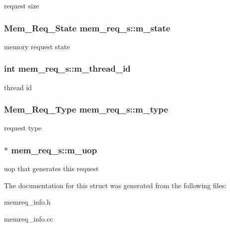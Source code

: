 \label{structmem__req__s_a4d0488370174c8f3b7200cc4658c9d32}
request size \hypertarget{structmem__req__s_a06db9581649b020ba9b693397a2b90f7}{
\subsubsection[{m\_\-state}]{\setlength{\rightskip}{0pt plus 5cm}Mem\_\-Req\_\-State {\bf mem\_\-req\_\-s::m\_\-state}}}
\label{structmem__req__s_a06db9581649b020ba9b693397a2b90f7}
memory request state \hypertarget{structmem__req__s_a8f90cf134af2d0965d436574f77693ef}{
\subsubsection[{m\_\-thread\_\-id}]{\setlength{\rightskip}{0pt plus 5cm}int {\bf mem\_\-req\_\-s::m\_\-thread\_\-id}}}
\label{structmem__req__s_a8f90cf134af2d0965d436574f77693ef}
thread id \hypertarget{structmem__req__s_a9cc3c968ca7bea8f7e9585b2aaea0ede}{
\subsubsection[{m\_\-type}]{\setlength{\rightskip}{0pt plus 5cm}Mem\_\-Req\_\-Type {\bf mem\_\-req\_\-s::m\_\-type}}}
\label{structmem__req__s_a9cc3c968ca7bea8f7e9585b2aaea0ede}
request type \hypertarget{structmem__req__s_ac912d0ec02a27cbd6d126ab1482c201b}{
\subsubsection[{m\_\-uop}]{$\ast$ {\bf mem\_\-req\_\-s::m\_\-uop}}}
\label{structmem__req__s_ac912d0ec02a27cbd6d126ab1482c201b}
uop that generates this request 

The documentation for this struct was generated from the following files:\begin{DoxyCompactItemize}
\item 
memreq\_\-info.h\item 
memreq\_\-info.cc\end{DoxyCompactItemize}
